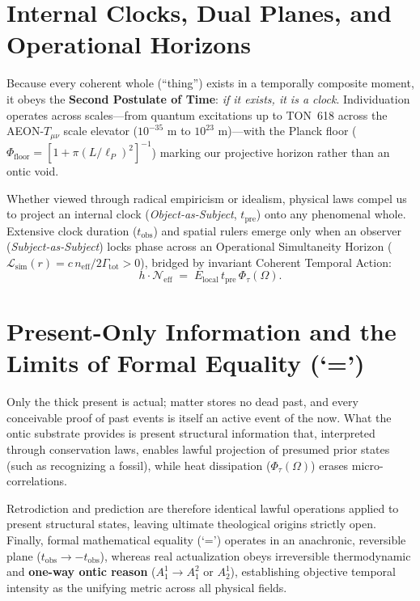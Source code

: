 \documentclass[11pt,a4paper]{article}
\begin{document}
\section{Internal Clocks, Dual Planes, and Operational Horizons}
Because every coherent whole (``thing'') exists in a temporally composite moment, it obeys the \textbf{Second Postulate of Time}: \emph{if it exists, it is a clock}. Individuation operates across scales---from quantum excitations up to TON~618 across the \textsc{AEON}-$T_{\mu\nu}$ scale elevator ($10^{-35}\text{ m}$ to $10^{23}\text{ m}$)---with the Planck floor ($\Phi_{\text{floor}} = [1 + \pi(L/\ell_P)^2]^{-1}$) marking our projective horizon rather than an ontic void.

Whether viewed through radical empiricism or idealism, physical laws compel us to project an internal clock (\emph{Object-as-Subject}, $t_{\text{pre}}$) onto any phenomenal whole. Extensive clock duration ($t_{\text{obs}}$) and spatial rulers emerge only when an observer (\emph{Subject-as-Subject}) locks phase across an Operational Simultaneity Horizon ($\mathcal{L}_{\text{sim}}(r) = c\,n_{\text{eff}} / 2\Gamma_{\text{tot}} > 0$), bridged by invariant Coherent Temporal Action:
\begin{equation}
  h \cdot \mathcal{N}_{\text{eff}} \;=\; E_{\text{local}}\,t_{\text{pre}}\,\Phi_\tau(\Omega).
\end{equation}

\section{Present-Only Information and the Limits of Formal Equality (`=')}
Only the thick present is actual; matter stores no dead past, and every conceivable proof of past events is itself an active event of the now. What the ontic substrate provides is present structural information that, interpreted through conservation laws, enables lawful projection of presumed prior states (such as recognizing a fossil), while heat dissipation ($\Phi_\tau(\Omega)$) erases micro-correlations.

Retrodiction and prediction are therefore identical lawful operations applied to present structural states, leaving ultimate theological origins strictly open. Finally, formal mathematical equality (`=') operates in an anachronic, reversible plane ($t_{\text{obs}} \to -t_{\text{obs}}$), whereas real actualization obeys irreversible thermodynamic and \textbf{one-way ontic reason} ($A_1^1 \to A_1^2$ or $A_2^1$), establishing objective temporal intensity as the unifying metric across all physical fields.
\end{document}
